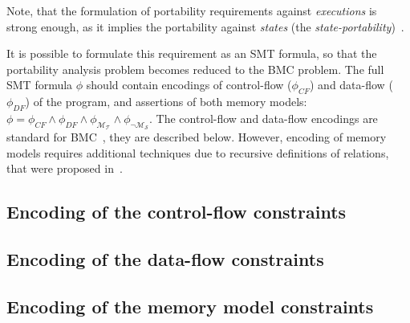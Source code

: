 Note, that the formulation of portability requirements against \textit{executions} is strong enough, as it implies the portability against \textit{states} (the \textit{state-portability})~\cite{Porthos17}.

It is possible to formulate this requirement as an SMT formula, so that the portability analysis problem becomes reduced to the BMC problem. The full SMT formula $\phi$ should contain encodings of control-flow ($\phi_{CF}$) and data-flow ($\phi_{DF}$) of the program, and assertions of both memory models: $\phi = \phi_{CF} \land \phi_{DF} \land \phi_{\mathcal{M_T}} \land \phi_{\lnot\mathcal{M_S}}$. The control-flow and data-flow encodings are standard for BMC~\cite{collavizza2006exploration}, they are described below. However, encoding of memory models requires additional techniques due to recursive definitions of relations, that were proposed in~\cite{Porthos17}.

\subsection{Encoding of the control-flow constraints}
\label{ch:port:enc:cf}


\subsection{Encoding of the data-flow constraints}
\label{ch:port:enc:df}


\subsection{Encoding of the memory model constraints}
\label{ch:port:enc:wmm}

